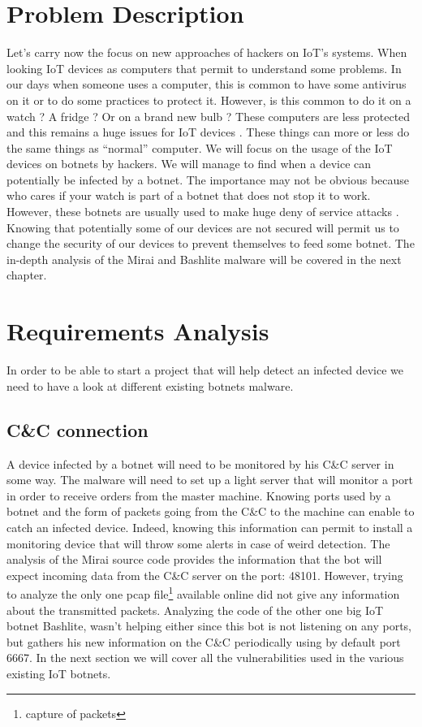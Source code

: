 \documentclass{report}
\begin{document}
\chapter{Problem Description}
Let's carry now the focus on new approaches of hackers on IoT's systems. When looking IoT devices as computers that permit to understand some problems. In our days when someone uses a computer, this is common to have some antivirus on it or to do some practices to protect it. However, is this common to do it on a watch ? A fridge ? Or on a brand new bulb ? These computers are less protected and this remains a huge issues for IoT devices \autocite{yang2017survey}. These things can more or less do the same things as ``normal'' computer. We will focus on the usage of the IoT devices on botnets by hackers. We will manage to find when a device can potentially be infected by a botnet. The importance may not be obvious because who cares if your watch is part of a botnet that does not stop it to work. However, these botnets are usually used to make huge deny of service attacks \autocite{hallman2017ioddos}. Knowing that potentially some of our devices are not secured will permit us to change the security of our devices to prevent themselves to feed some botnet.\newline
The in-depth analysis of the Mirai and Bashlite malware will be covered in the next chapter.

\chapter{Requirements Analysis}
In order to be able to start a project that will help detect an infected device we need to have a look at different existing botnets malware.

\section{C\&C connection}
A device infected by a botnet will need to be monitored by his C\&C server in some way. The malware will need to set up a light server that will monitor a port in order to receive orders from the master machine. Knowing ports used by a botnet and the form of packets going from the C\&C to the machine can enable to catch an infected device. Indeed, knowing this information can permit to install a monitoring device that will throw some alerts in case of weird detection.\newline
The analysis of the Mirai source code provides the information that the bot will expect incoming data from the C\&C server on the port: 48101.
However, trying to analyze the only one pcap file\footnote{capture of packets} available online did not give any information about the transmitted packets.
Analyzing the code of the other one big IoT botnet Bashlite, wasn't helping either since this bot is not listening on any ports, but gathers his new information on the C\&C periodically using by default port 6667.\newline
In the next section we will cover all the vulnerabilities used in the various existing IoT botnets.
\end{document}
